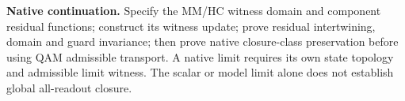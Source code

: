 \documentclass[11pt,a4paper]{article}
\begin{document}
\medskip
\noindent\textbf{Native continuation.} Specify the MM/HC witness domain and
component residual functions; construct its witness update; prove residual
intertwining, domain and guard invariance; then prove native closure-class
preservation before using QAM admissible transport. A native limit requires
its own state topology and admissible limit witness. The scalar or model
limit alone does not establish global all-readout closure.
\end{document}
